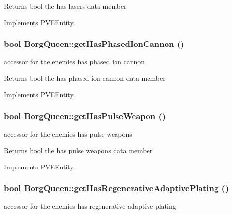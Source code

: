 \begin{DoxyReturn}{Returns}
bool the has lasers data member 
\end{DoxyReturn}


Implements \hyperlink{classPVEEntity}{PVEEntity}.

\hypertarget{classBorgQueen_ad443100edc3438d13c2125ada2e813b5}{
\subsubsection[{getHasPhasedIonCannon}]{\setlength{\rightskip}{0pt plus 5cm}bool BorgQueen::getHasPhasedIonCannon ()}}
\label{d6/d8d/classBorgQueen_ad443100edc3438d13c2125ada2e813b5}
accessor for the enemies has phased ion cannon

\begin{DoxyReturn}{Returns}
bool the has phased ion cannon data member 
\end{DoxyReturn}


Implements \hyperlink{classPVEEntity}{PVEEntity}.

\hypertarget{classBorgQueen_afff65fc18c7fca051258a34e44e1c56a}{
\subsubsection[{getHasPulseWeapon}]{\setlength{\rightskip}{0pt plus 5cm}bool BorgQueen::getHasPulseWeapon ()}}
\label{d6/d8d/classBorgQueen_afff65fc18c7fca051258a34e44e1c56a}
accessor for the enemies has pulse weapons

\begin{DoxyReturn}{Returns}
bool the has pulse weapons data member 
\end{DoxyReturn}


Implements \hyperlink{classPVEEntity}{PVEEntity}.

\hypertarget{classBorgQueen_a269dea27e5cccc2cef605153bef654bd}{
\subsubsection[{getHasRegenerativeAdaptivePlating}]{\setlength{\rightskip}{0pt plus 5cm}bool BorgQueen::getHasRegenerativeAdaptivePlating ()}}
\label{d6/d8d/classBorgQueen_a269dea27e5cccc2cef605153bef654bd}
accessor for the enemies has regenerative adaptive plating

